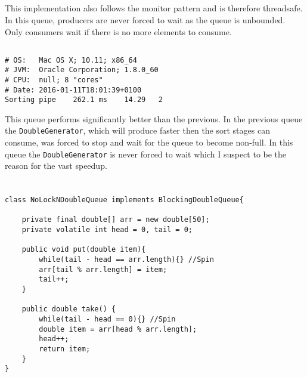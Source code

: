 \documentclass{ituhandin}
\begin{document}
\section{}
This implementation also follows the monitor pattern and is therefore threadsafe. In this queue, producers are never forced to wait as the queue is unbounded. Only consumers wait if there is no more elements to consume.
\section{}
\begin{lstlisting}[language={},frame={}]
# OS:   Mac OS X; 10.11; x86_64
# JVM:  Oracle Corporation; 1.8.0_60
# CPU:  null; 8 "cores"
# Date: 2016-01-11T18:01:39+0100
Sorting pipe    262.1 ms    14.29   2
\end{lstlisting}

This queue performs significantly better than the previous. In the previous queue the \texttt{DoubleGenerator}, which will produce faster then the sort stages can consume, was forced to stop and wait for the queue to become non-full. In this queue the \texttt{DoubleGenerator} is never forced to wait which I suspect to be the reason for the vast speedup.

\chapter{} %
\section{} %
\begin{lstlisting}[caption= Implementation of the \texttt{UnboundedDoubleQueue} blocking queue]
class NoLockNDoubleQueue implements BlockingDoubleQueue{

    private final double[] arr = new double[50];
    private volatile int head = 0, tail = 0;

    public void put(double item){
        while(tail - head == arr.length){} //Spin
        arr[tail % arr.length] = item;
        tail++;
    }

    public double take() { 
        while(tail - head == 0){} //Spin
        double item = arr[head % arr.length];
        head++;
        return item; 
    }
}
\end{lstlisting}
\section{} %
\end{document}
